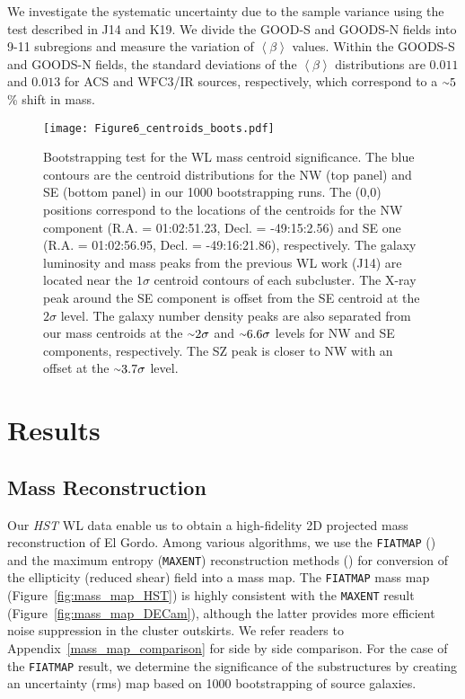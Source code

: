 \documentclass[twocolumn]{aastex631}
\newcommand{\elgordo}{El Gordo}
\newcommand{\mytilde}{\raise.19ex\hbox{$\scriptstyle\sim$}}
\begin{document}
We investigate the systematic uncertainty due to the sample variance using the test described in J14 and K19. 
We divide the GOOD-S and GOODS-N fields into 9-11 subregions and measure the variation of $\left < \beta \right >$ values. 
Within the GOODS-S and GOODS-N fields, the standard deviations of the $\left < \beta \right >$ distributions are $0.011$ and $0.013$ for ACS and WFC3/IR sources, respectively, which correspond to a $\mytilde5$\% shift in mass.



\begin{figure}
\centering
\texttt{[image: Figure6\_centroids\_boots.pdf]}
\caption{Bootstrapping test for the WL mass centroid significance. 
The blue contours are the centroid distributions for the NW (top panel) and SE (bottom panel) in our 1000 bootstrapping runs. The (0,0) positions correspond to the locations of the centroids for the NW component (R.A. = 01:02:51.23, Decl. = -49:15:2.56) and SE one (R.A. = 01:02:56.95, Decl. = -49:16:21.86), respectively. 
The galaxy luminosity and mass peaks from the previous WL work (J14) are located near the $1\sigma$ centroid contours of each subcluster. 
The X-ray peak around the SE component is offset from the SE centroid at the $2\sigma$ level. 
The galaxy number density peaks are also separated from our mass centroids at the $\mytilde2\sigma$ and $\mytilde6.6\sigma$ levels for NW and SE components, respectively. 
The SZ peak is closer to NW with an offset at the $\mytilde3.7\sigma$ level.}
\label{fig:centroids}
\end{figure}





\section{Results} \label{section_results}
\subsection{Mass Reconstruction} \label{mass_map}
Our {\it HST} WL data enable us to obtain a high-fidelity 2D projected mass reconstruction of \elgordo. 
Among various algorithms, we use the {\tt FIATMAP} (\citealt{FIATMAP}) and the maximum entropy ({\tt MAXENT}) reconstruction methods (\citealt{Jee2007b}) for conversion of the ellipticity (reduced shear) field into a mass map. 
The {\tt FIATMAP} mass map (Figure~\ref{fig:mass_map_HST}) is highly consistent with the {\tt MAXENT} result (Figure~\ref{fig:mass_map_DECam}), although the latter provides more efficient noise suppression in the cluster outskirts. 
We refer readers to Appendix~\ref{mass_map_comparison} for side by side comparison. 
For the case of the {\tt FIATMAP} result, we determine the significance of the substructures by creating an uncertainty (rms) map based on 1000 bootstrapping of source galaxies.
\end{document}
